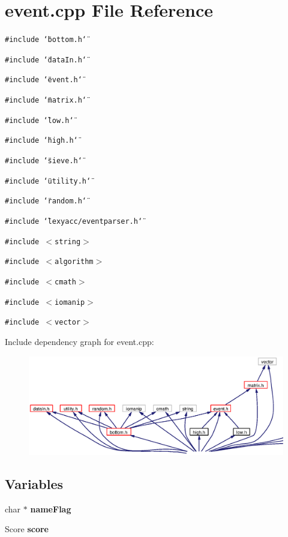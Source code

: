 \section{event.cpp File Reference}
\label{event_8cpp}
{\tt \#include \char`\"{}bottom.h\char`\"{}}\par
{\tt \#include \char`\"{}data\-In.h\char`\"{}}\par
{\tt \#include \char`\"{}event.h\char`\"{}}\par
{\tt \#include \char`\"{}matrix.h\char`\"{}}\par
{\tt \#include \char`\"{}low.h\char`\"{}}\par
{\tt \#include \char`\"{}high.h\char`\"{}}\par
{\tt \#include \char`\"{}sieve.h\char`\"{}}\par
{\tt \#include \char`\"{}utility.h\char`\"{}}\par
{\tt \#include \char`\"{}random.h\char`\"{}}\par
{\tt \#include \char`\"{}lexyacc/eventparser.h\char`\"{}}\par
{\tt \#include $<$string$>$}\par
{\tt \#include $<$algorithm$>$}\par
{\tt \#include $<$cmath$>$}\par
{\tt \#include $<$iomanip$>$}\par
{\tt \#include $<$vector$>$}\par


Include dependency graph for event.cpp:\begin{figure}[H]
\begin{center}
\leavevmode
\includegraphics[width=420pt]{event_8cpp__incl}
\end{center}
\end{figure}
\subsection*{Variables}
\begin{CompactItemize}
\item 
char $\ast$ {\bf name\-Flag}
\item 
Score {\bf score}
\end{CompactItemize}


